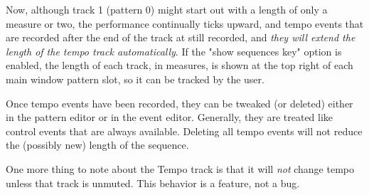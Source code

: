 Now, although track 1 (pattern 0) might start out with a length of only a
measure or two, the performance continually ticks upward, and tempo events that
are recorded after the end of the track at still recorded, and
\textsl{they will extend the length of the tempo track automatically}.
If the "show sequences key" option is enabled, the length of each track, in
measures, is shown at the top right of each main window pattern slot, so it can
be tracked by the user.

Once tempo events have been recorded, they can be tweaked (or deleted)
either in the pattern editor or in the event editor.  Generally, they are
treated like control events that are always available.  Deleting all tempo
events will not reduce the (possibly new) length of the sequence.

One more thing to note about the Tempo track is that it will
\textsl{not} change tempo unless that track is unmuted.
This behavior is a feature, not a bug.


